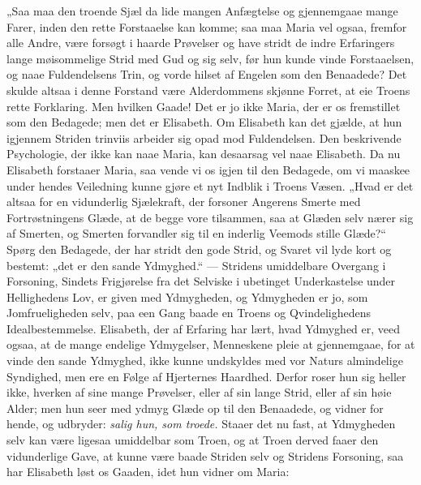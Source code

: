 \documentclass[12pt,a4paper]{book}
\begin{document}
„Saa maa den troende Sjæl da lide mangen Anfægtelse og gjennemgaae mange Farer,
inden den rette Forstaaelse kan komme; saa maa Maria vel ogsaa, fremfor alle
Andre, være forsøgt i haarde Prøvelser og have stridt de indre Erfaringers lange
møisommelige Strid med Gud og sig selv, før hun kunde vinde Forstaaelsen, og
naae Fuldendelsens Trin, og vorde hilset af Engelen som den Benaadede? Det
skulde altsaa i denne Forstand være Alderdommens skjønne Forret, at eie Troens
rette Forklaring. Men hvilken Gaade! Det er jo ikke Maria, der er os fremstillet
som den Bedagede; men det er Elisabeth. Om Elisabeth kan det gjælde, at hun
igjennem Striden trinviis arbeider sig opad mod Fuldendelsen. Den beskrivende
Psychologie, der ikke kan naae Maria, kan desaarsag vel naae Elisabeth. Da nu
Elisabeth forstaaer Maria, saa vende vi os igjen til den Bedagede, om vi maaskee
under hendes Veiledning kunne gjøre et nyt Indblik i
Troens Væsen. „Hvad er det altsaa for en vidunderlig Sjælekraft, der forsoner
Angerens Smerte med Fortrøstningens Glæde, at de begge vore tilsammen, saa at
Glæden selv nærer sig af Smerten, og Smerten forvandler sig til en inderlig
Veemods stille Glæde?“ Spørg den Bedagede, der har stridt den gode Strid, og
Svaret vil lyde kort og bestemt: „det er den sande Ydmyghed.“ --- Stridens
umiddelbare Overgang i Forsoning, Sindets Frigjørelse fra det Selviske i
ubetinget Underkastelse under Hellighedens Lov, er given med Ydmygheden, og
Ydmygheden er jo, som Jomfrueligheden selv, paa een Gang baade en Troens og
Qvindelighedens Idealbestemmelse. Elisabeth, der af Erfaring har lært, hvad
Ydmyghed er, veed ogsaa, at de mange endelige Ydmygelser, Menneskene pleie at
gjennemgaae, for at vinde den sande Ydmyghed, ikke kunne undskyldes med vor
Naturs almindelige Syndighed, men ere en Følge af Hjerternes Haardhed. Derfor
roser hun sig heller ikke, hverken af sine mange Prøvelser, eller af sin lange
Strid, eller af sin høie Alder; men hun seer med ydmyg Glæde op til den
Benaadede, og vidner for hende, og udbryder: \emph{salig hun, som troede.}
Staaer det nu fast, at Ydmygheden selv kan være ligesaa umiddelbar som Troen, og
at Troen derved faaer den vidunderlige Gave, at kunne være baade Striden selv og
Stridens Forsoning, saa har Elisabeth løst os Gaaden, idet hun vidner om Maria:
\end{document}

